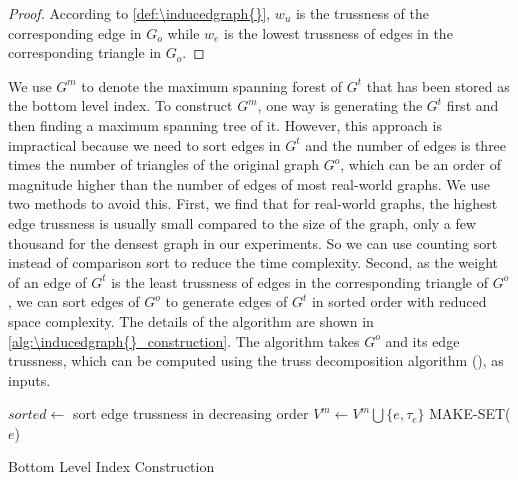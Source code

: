 \begin{proof}
According to \autoref{def:\inducedgraph{}}, $w_u$ is the trussness of the corresponding edge in $G_o$ while $w_e$ is the lowest trussness of edges in the corresponding triangle in $G_o$. 
\end{proof}

We use $G^m$ to denote the maximum spanning forest of $G^t$ that has been stored as the bottom level index. To construct $G^m$, one way is generating the \inducedgraph{} $G^t$ first and then finding a maximum spanning tree of it. However, this approach is impractical because we need to sort edges in $G^t$ and the number of edges is three times the number of triangles of the original graph $G^o$, which can be an order of magnitude higher than the number of edges of most real-world graphs. We use two methods to avoid this. First, we find that for real-world graphs, the highest edge trussness is usually small compared to the size of the graph, \eg only a few thousand for the densest graph in our experiments. So we can use counting sort instead of comparison sort to reduce the time complexity. Second, as the weight of an edge of $G^t$ is the least trussness of edges in the corresponding triangle of $G^o$, we can sort edges of $G^o$ to generate edges of $G^t$ in sorted order with reduced space complexity. 
The details of the algorithm are shown in \autoref{alg:\inducedgraph{}_construction}. The algorithm takes $G^o$ and its edge trussness, which can be computed using the truss decomposition algorithm (\cite{wang2012truss}), as inputs.

\begin{algorithm}
	\BlankLine
	$sorted \gets$ sort edge trussness in decreasing order\;
	 {
	   $V^{m} \gets V^{m} \bigcup \{e, \tau_{e}\}$\;
		 MAKE-SET($e$)\;
	}
	\caption{Bottom Level Index Construction}\label{alg:\inducedgraph{}_construction}
\end{algorithm}

